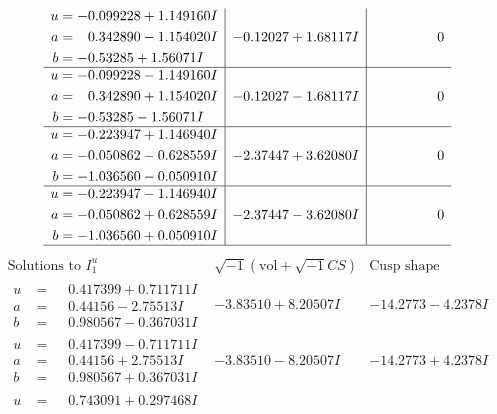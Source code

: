 \documentclass[1p]{elsarticle_modified}
\theoremstyle{definition}
\newcommand{\I}{\sqrt{-1}}
\begin{document}
$$\begin{array}{c|c|c}
\begin{aligned}
u &= -0.099228 + 1.149160 I \\
a &= \phantom{-}0.342890 - 1.154020 I \\
b &= -0.53285 + 1.56071 I\end{aligned}
 & -0.12027 + 1.68117 I & \phantom{-0.000000 } 0 \\ \hline\begin{aligned}
u &= -0.099228 - 1.149160 I \\
a &= \phantom{-}0.342890 + 1.154020 I \\
b &= -0.53285 - 1.56071 I\end{aligned}
 & -0.12027 - 1.68117 I & \phantom{-0.000000 } 0 \\ \hline\begin{aligned}
u &= -0.223947 + 1.146940 I \\
a &= -0.050862 - 0.628559 I \\
b &= -1.036560 - 0.050910 I\end{aligned}
 & -2.37447 + 3.62080 I & \phantom{-0.000000 } 0 \\ \hline\begin{aligned}
u &= -0.223947 - 1.146940 I \\
a &= -0.050862 + 0.628559 I \\
b &= -1.036560 + 0.050910 I\end{aligned}
 & -2.37447 - 3.62080 I & \phantom{-0.000000 } 0\\
 \hline 
 \end{array}$$\newpage$$\begin{array}{c|c|c}  
\text{Solutions to }I^u_{1}& \I (\text{vol} + \sqrt{-1}CS) & \text{Cusp shape}\\
 \hline 
\begin{aligned}
u &= \phantom{-}0.417399 + 0.711711 I \\
a &= \phantom{-}0.44156 - 2.75513 I \\
b &= \phantom{-}0.980567 - 0.367031 I\end{aligned}
 & -3.83510 + 8.20507 I & -14.2773 - 4.2378 I \\ \hline\begin{aligned}
u &= \phantom{-}0.417399 - 0.711711 I \\
a &= \phantom{-}0.44156 + 2.75513 I \\
b &= \phantom{-}0.980567 + 0.367031 I\end{aligned}
 & -3.83510 - 8.20507 I & -14.2773 + 4.2378 I \\ \hline\begin{aligned}
u &= \phantom{-}0.743091 + 0.297468 I \\

\end{aligned}
\end{array}$$
\end{document}
